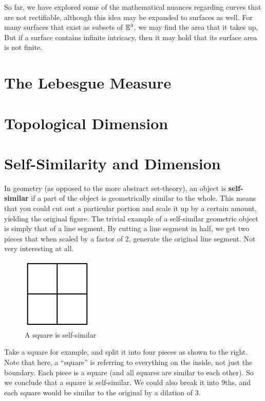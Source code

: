 So far, we have explored some of the mathematical nuances regarding curves that are not rectifiable, although this idea may be expanded to surfaces as well. For many surfaces that exist as subsets of $\mathbb{E}^3$, we may find the area that it takes up. But if a surface contains infinite intricacy, then it may hold that its surface area is not finite. 

\section{The Lebesgue Measure}
\Blindtext

\section{Topological Dimension}
\Blindtext

\clearpage

\section{Self-Similarity and Dimension}

In geometry (as opposed to the more abstract set-theory), an object is \textbf{self-similar} if a part of the object is geometrically similar to the whole. This means that you could cut out a particular portion and scale it up by a certain amount, yielding the original figure. The trivial example of a self-similar geometric object is simply that of a line segment. By cutting a line segment in half, we get two pieces that when scaled by a factor of 2, generate the original line segment. Not very interesting at all.\\

\begin{figure}
  \begin{center}
    \includegraphics[width=0.3\textwidth]{Images/1.4.1.jpg}
  \end{center}
  \caption{A square is self-similar}
\end{figure}

Take a square for example, and split it into four pieces as shown to the right. Note that here, a ``square'' is referring to everything on the inside, not just the boundary. Each piece is a square (and all squares are similar to each other).  So we conclude that a square is self-similar. We could also break it into 9ths, and each square would be similar to the original by a dilation of 3.\\

